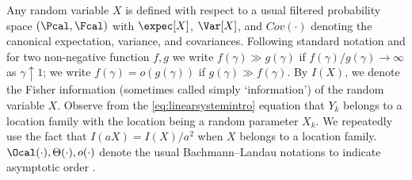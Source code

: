  Any random variable $X$ is defined with respect to a usual filtered probability space $(\Pcal,\Fcal)$ with $\expec[X]$, $\Var[X]$, and $Cov(\cdot)$ denoting the canonical expectation, variance, and covariances. Following standard notation and for two non-negative function $f,g$ we write $f(\gamma)\gg g(\gamma)$ if $f(\gamma)/g(\gamma) \rightarrow \infty$ as $\gamma \uparrow 1$; we write  $f(\gamma)=o(g(\gamma))$ if $g(\gamma)\gg f(\gamma)$. By $I(X)$, we denote the Fisher information (sometimes called simply ‘information’) of the random variable $X$. Observe from the \ref{eq:linearsystemintro} equation that $Y_k$ belongs to a location family with the location being a random parameter $X_k$. We repeatedly use the fact that $I(aX)=I(X)/a^2$ when $X$ belongs to a location family. $\Ocal(\cdot),\Theta(\cdot), o(\cdot)$ denote the usual Bachmann–Landau notations \cite{cormen_introduction_2022} to indicate asymptotic order  .